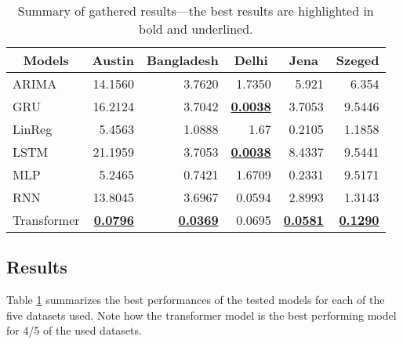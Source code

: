 \begin{table}[!ht]
\centering
\caption {Summary of gathered results---the best results are highlighted in bold and underlined.} \label{tab:ResultsTable} 
\begin{tabular}{|l|r|r|r|r|r|}
\hline
\multicolumn{1}{|c|}{Models} & \multicolumn{1}{c|}{Austin} & \multicolumn{1}{c|}{Bangladesh} & \multicolumn{1}{c|}{Delhi} & \multicolumn{1}{c|}{Jena} & \multicolumn{1}{l|}{Szeged} \\ \hline
ARIMA                        & 14.1560                     & 3.7620                          & 1.7350                     & 5.921                     & 6.354                       \\ \hline
GRU                          & 16.2124                     & 3.7042                          & {\ul \textbf{0.0038}}      & 3.7053                    & 9.5446                      \\ \hline
LinReg                       & 5.4563                      & 1.0888                          & 1.67                       & 0.2105                    & 1.1858                      \\ \hline
LSTM                         & 21.1959                     & 3.7053                          & {\ul \textbf{0.0038}}      & 8.4337                    & 9.5441                      \\ \hline
MLP                          & 5.2465                      & 0.7421                          & 1.6709                     & 0.2331                    & 9.5171                      \\ \hline
RNN                          & 13.8045                     & 3.6967                          & 0.0594                     & 2.8993                    & 1.3143                      \\ \hline
Transformer                  & {\ul \textbf{0.0796}}       & {\ul \textbf{0.0369}}           & 0.0695                     & {\ul \textbf{0.0581}}     & {\ul \textbf{0.1290}}       \\ \hline
\end{tabular}
\end{table}

\subsection{Results}
Table \ref{tab:ResultsTable} summarizes the best performances of the tested models for each of the five datasets used. 
Note how the transformer model is the best performing model for 4/5 of the used datasets.

